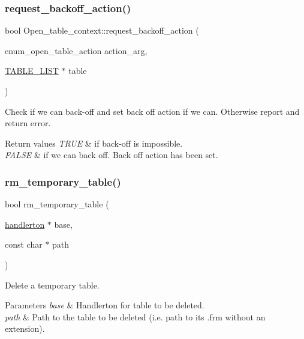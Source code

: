 \subsubsection{\texorpdfstring{request\+\_\+backoff\+\_\+action()}{request\_backoff\_action()}}
{\footnotesize\ttfamily bool Open\+\_\+table\+\_\+context\+::request\+\_\+backoff\+\_\+action (\begin{DoxyParamCaption}\item[{enum\+\_\+open\+\_\+table\+\_\+action}]{action\+\_\+arg,  }\item[{\mbox{\hyperlink{structTABLE__LIST}{T\+A\+B\+L\+E\+\_\+\+L\+I\+ST}} $\ast$}]{table }\end{DoxyParamCaption})}

Check if we can back-\/off and set back off action if we can. Otherwise report and return error.


\begin{DoxyRetVals}{Return values}
{\em T\+R\+UE} & if back-\/off is impossible. \\
\hline
{\em F\+A\+L\+SE} & if we can back off. Back off action has been set. \\
\hline
\end{DoxyRetVals}
\mbox{\label{group__Data__Dictionary_ga2f6730cd1feb3014042adbf998ca9203}} 
\subsubsection{\texorpdfstring{rm\+\_\+temporary\+\_\+table()}{rm\_temporary\_table()}}
{\footnotesize\ttfamily bool rm\+\_\+temporary\+\_\+table (\begin{DoxyParamCaption}\item[{\mbox{\hyperlink{structhandlerton}{handlerton}} $\ast$}]{base,  }\item[{const char $\ast$}]{path }\end{DoxyParamCaption})}

Delete a temporary table.


\begin{DoxyParams}{Parameters}
{\em base} & Handlerton for table to be deleted. \\
\hline
{\em path} & Path to the table to be deleted (i.\+e. path to its .frm without an extension).\\
\hline
\end{DoxyParams}

